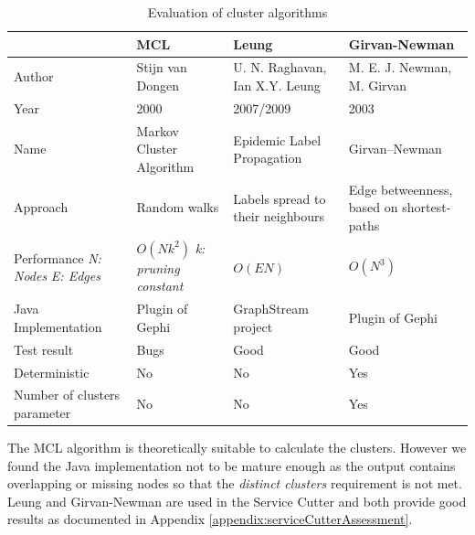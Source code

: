 \begin{table}[H]
	\centering
	\caption{Evaluation of cluster algorithms}
	\label{tab:clusterAlgorithms}
	\begin{tabular}{|p{2.2cm}|p{4cm}|p{4cm}|p{4cm}|}
		\hline
		& \textbf{MCL}               & \textbf{Leung}                    & \textbf{Girvan-Newman}  \\ \hline
		Author              & Stijn van Dongen\cite{markovCluster} & U. N. Raghavan\cite{raghavan}, Ian X.Y. Leung\cite{leung}    & M. E. J. Newman, M. Girvan\cite{girvan} \\ \hline
		Year                & 2000                       & 2007/2009                         & \multicolumn{1}{l|}{2003}                       \\ \hline
		Name                & Markov Cluster Algorithm   & Epidemic Label Propagation        & \multicolumn{1}{l|}{Girvan–Newman}              \\ \hline
		Approach            & Random walks               & Labels spread to their neighbours & Edge betweenness, based on shortest-paths       \\ \hline
		Performance \newline \textit{N: Nodes} \newline \textit{E: Edges}         & $O (N k^2)$ \newline \textit{k: pruning constant} \cite[p.126]{markovCluster} & $O( E N )$ \cite[p.3]{leung}                         & $O ( N^3 )$\cite[p.14]{girvan}       \\ \hline
		Java Implementation & Plugin of Gephi\cite{gephiMarkov} & GraphStream project\cite{leungGraphstream} & Plugin of Gephi\cite{gephiMarkov} \\ \hline
		Test result         & Bugs                       & Good                              & \multicolumn{1}{l|}{Good}                       \\ \hline
		Deterministic & No & No & Yes \\
		\hline
		Number of clusters parameter & No & No & Yes \\
		\hline
	\end{tabular}
\end{table}

The \gls{MCL} algorithm is theoretically suitable to calculate the clusters. However we found the Java implementation not to be mature enough as the output contains overlapping or missing nodes so that the \textit{distinct clusters} requirement is not met. Leung and Girvan-Newman are used in the Service Cutter and both provide good results as documented in Appendix \ref{appendix:serviceCutterAssessment}.


